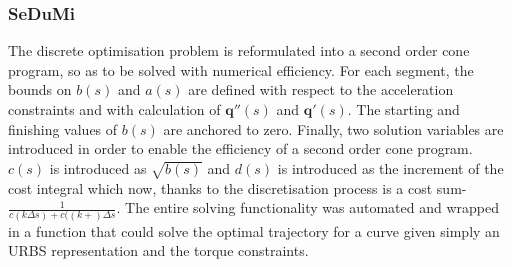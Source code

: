 \subsubsection{SeDuMi}

The discrete optimisation problem is reformulated into a second order cone program, so as to be solved with numerical efficiency. For each segment, the bounds on $b(s)$ and $a(s)$ are defined with respect to the acceleration constraints and with calculation of $\textbf{q}''(s)$ and $\textbf{q}'(s)$. The starting and finishing values of $b(s)$ are anchored to zero. Finally, two solution variables are introduced in order to enable the efficiency of a second order cone program. $c(s)$ is introduced as $\sqrt{b(s)}$ and $d(s)$ is introduced as the increment of the cost integral which now, thanks to the discretisation process is a cost sum- $\frac{1}{c(k\Delta s) + c((k+)\Delta s}$.
The entire solving functionality was automated and wrapped in a function that could solve the optimal trajectory for a curve  given simply an URBS representation and the torque constraints.

